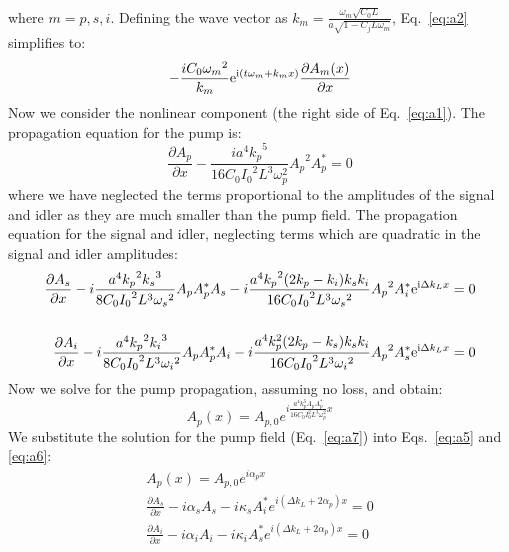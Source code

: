 where $m=p,s,i$. Defining the wave vector as ${k_m} = \frac{{{\omega _m}\sqrt {{C_0}L} }}{{a\sqrt {1 - {C_j}L{\omega _m}} }}$, Eq.~\ref{eq:a2} simplifies to:
\begin{equation}
 - \frac{{i{C_0}{\omega _m}^2}}{{{k_m}}}{{\rm{e}}^{{\rm{i}}(t{\omega _m} + {k_m}x)}} \frac{{\partial {A_m}(x)}}{{\partial x}} \label{eq:a3}
\end{equation}
Now we consider the nonlinear component (the right side of Eq.~\ref{eq:a1}). The propagation equation for the pump is:
\begin{equation}
\frac{{\partial {A_p}}}{{\partial x}} - \frac{{i{a^4}{k_p}^5}}{{16{C_0}{I_0}^2{L^3}\omega _p^2}}{A_p}^2A_p^* = 0 \label{eq:a4}
\end{equation}
where we have neglected the terms proportional to the amplitudes of the signal and idler as they are much smaller than the pump field. The propagation equation for the signal and idler, neglecting terms which are quadratic in the signal and idler amplitudes:
\begin{align}
\frac{{\partial {A_s}}}{{\partial x}} - i\frac{{{a^4}{k_p}^2{k_s}^3}}{{8{C_0}{I_0}^2{L^3}{\omega _s}^2}}{A_p}A_p^*{A_s} -  i\frac{{{a^4}{k_p}^2(2{k_p} - {k_i}){k_s}{k_i}}}{{16{C_0}{I_0}^2{L^3}{\omega _s}^2}}{A_p}^2A_i^*{{\rm{e}}^{{\rm{i}}\Delta {k_L}x}} = 0 \label{eq:a5}\\
\notag \\
\frac{{\partial {A_i}}}{{\partial x}}  - i\frac{{{a^4}{k_p}^2{k_i}^3}}{{8{C_0}{I_0}^2{L^3}{\omega _i}^2}}{A_p}A_p^*{A_i} -  i\frac{{{a^4}k_p^2(2{k_p} - {k_s}){k_s}{k_i}}}{{16{C_0}{I_0}^2{L^3}{\omega _i}^2}}{A_p}^2A_s^*{{\rm{e}}^{{\rm{i}}\Delta {k_L}x}} = 0 \label{eq:a6}
\end{align}
Now we solve for the pump propagation, assuming no loss, and obtain:
\begin{equation}
A_p(x) = A_{p,0}e^{i\frac{a^4 k_p^5 A_p A_p^*}{16 C_0 I_0^2 L^3\omega _p^2}x} \label{eq:a7}
\end{equation}
We substitute the solution for the pump field (Eq.~\ref{eq:a7}) into Eqs.~\ref{eq:a5} and \ref{eq:a6}:
\begin{align}
A_p(x) = A_{p,0}e^{i\alpha _p x} \label{eq:a8}\\
\frac{\partial A_s}{\partial x} - i\alpha _s A_s - i\kappa _s A_i^* e^{i(\Delta k_L + 2\alpha _p)x} = 0 \label{eq:a9}\\
\frac{\partial A_i}{\partial x} - i\alpha _i A_i - i\kappa _i A_s^* e^{i(\Delta k_L + 2\alpha _p)x} = 0 \label{eq:a10}
\end{align}
